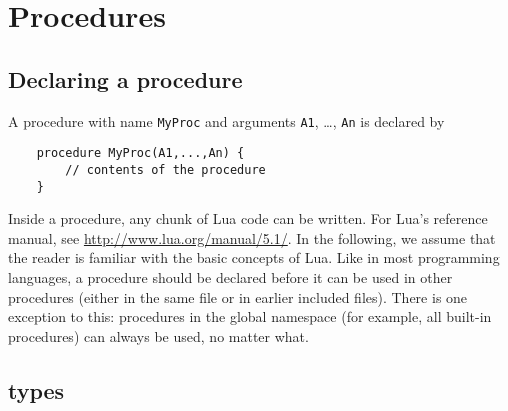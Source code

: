 
\section{Procedures}
\subsection{Declaring a procedure}

A procedure with name {\tt MyProc} and arguments {\tt A1}, \ldots, {\tt An} is declared by 
\begin{lstlisting}
	procedure MyProc(A1,...,An) {
		// contents of the procedure
	}
\end{lstlisting}
Inside a procedure, any chunk of Lua code can be written. For Lua's reference manual, see \url{http://www.lua.org/manual/5.1/}. In the following, we assume that the reader is familiar with the basic concepts of Lua. Like in most programming languages, a procedure should be declared before it can be used in other procedures (either in the same file or in earlier included files). There is one exception to this: procedures in the global namespace (for example, all built-in procedures) can always be used, no matter what.

\subsection{\idp types}

